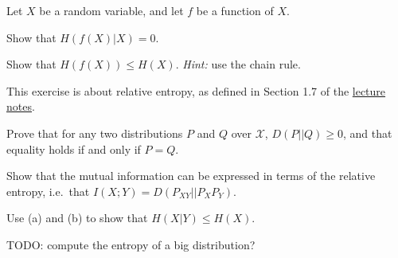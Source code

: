 \documentclass[a4paper,10pt,landscape,twocolumn]{scrartcl}
\begin{document}
\begin{exercise}
Let $X$ be a random variable, and let $f$ be a function of $X$.
	\begin{subex}[(1pt)]
	Show that $H(f(X) | X) = 0$.
	\end{subex}
	\begin{subex}[(2pt)]
	Show that $H(f(X)) \leq H(X)$. \emph{Hint:} use the chain rule.
	\end{subex}
\end{exercise}


\begin{exercise}
This exercise is about relative entropy, as defined in Section 1.7 of the \href{https://github.com/cschaffner/InformationTheory/raw/master/Script/InfTheory3.pdf}{lecture notes}. 
	\begin{subex}[(5pt)]
	Prove that for any two distributions $P$ and $Q$ over $\mathcal{X}$, $D(P||Q) \geq 0$, and that equality holds if and only if $P = Q$.
	\end{subex}
	\begin{subex}[(3pt)]
	Show that the mutual information can be expressed in terms of the relative entropy, i.e.\ that $I(X;Y) = D(P_{XY}||P_XP_Y)$.
	\end{subex}
	\begin{subex}[(1pt)]
	Use (a) and (b) to show that $H(X|Y) \leq H(X)$.
	\end{subex}
\end{exercise}



\begin{exercise}[Programming... (5pt)]
TODO: compute the entropy of a big distribution?
\end{exercise}
\end{document}
